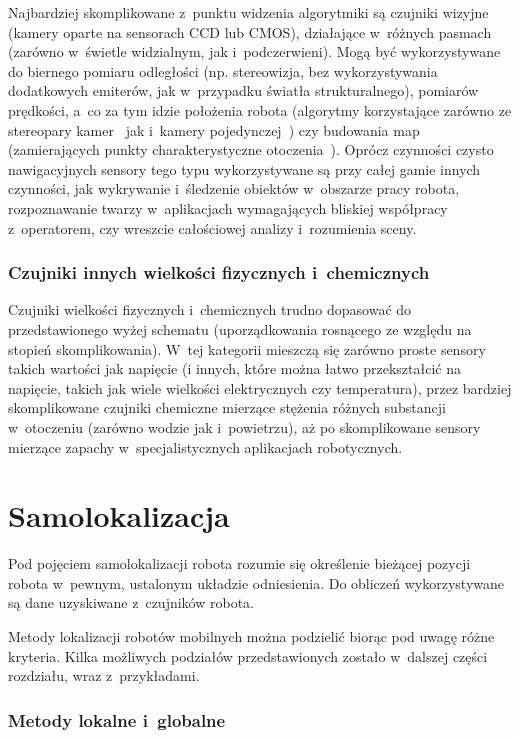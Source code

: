 Najbardziej skomplikowane z~punktu widzenia algorytmiki są czujniki wizyjne
(kamery oparte na sensorach CCD lub CMOS), działające w~różnych pasmach
(zarówno w~świetle widzialnym, jak i~podczerwieni). Mogą być wykorzystywane
do biernego pomiaru odległości (np. stereowizja, bez wykorzystywania dodatkowych
emiterów, jak w~przypadku światła strukturalnego), pomiarów prędkości,
a~co za tym idzie położenia robota (algorytmy korzystające zarówno ze stereopary
kamer~\cite{vodom_stereo} jak i~kamery pojedynczej~\cite{vodom_mono}) czy budowania
map (zamierających punkty charakterystyczne otoczenia~\cite{vslam}). Oprócz
czynności czysto nawigacyjnych sensory tego typu wykorzystywane są przy całej
gamie innych czynności, jak wykrywanie i~śledzenie obiektów w~obszarze pracy robota,
rozpoznawanie twarzy w~aplikacjach wymagających bliskiej współpracy z~operatorem,
czy wreszcie całościowej analizy i~rozumienia sceny.

\subsubsection{Czujniki innych wielkości fizycznych i~chemicznych}

Czujniki wielkości fizycznych i~chemicznych trudno dopasować do przedstawionego
wyżej schematu (uporządkowania rosnącego ze względu na stopień skomplikowania).
W~tej kategorii mieszczą się zarówno proste sensory takich wartości jak
napięcie (i innych, które można łatwo przekształcić na napięcie, takich jak
wiele wielkości elektrycznych czy temperatura), przez bardziej skomplikowane
czujniki chemiczne mierzące stężenia różnych substancji w~otoczeniu (zarówno
wodzie jak i~powietrzu), aż po skomplikowane sensory mierzące zapachy
w~specjalistycznych aplikacjach robotycznych.

\section{Samolokalizacja}

Pod pojęciem samolokalizacji robota rozumie się określenie bieżącej pozycji
robota w~pewnym, ustalonym układzie odniesienia. Do obliczeń wykorzystywane
są dane uzyskiwane z~czujników robota.

Metody lokalizacji robotów mobilnych można podzielić biorąc pod uwagę różne
kryteria. Kilka możliwych podziałów przedstawionych zostało w~dalszej części
rozdziału, wraz z~przykładami.

\subsubsection{Metody lokalne i~globalne}

